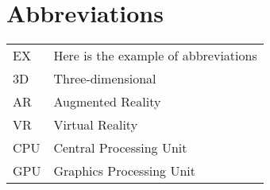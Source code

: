 \chapter*{Abbreviations} 
\begin{tabular}{ll}
  EX & Here is the example of abbreviations\\
  3D & Three-dimensional\\
  AR & Augmented Reality\\
  VR & Virtual Reality\\
  CPU & Central Processing Unit\\
  GPU & Graphics Processing Unit
\end{tabular}
